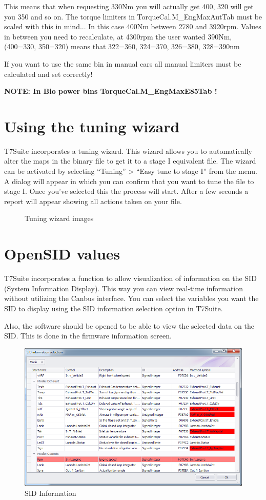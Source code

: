 \documentclass[11pt,a4paper]{book}
\newcommand{\Mfig}[1]{%
\begin{figure}[<+htpb+>]
    \centering
    \missingfigure{#1}
    \caption{#1}
\end{figure}}
\begin{document}
This means that when requesting 330Nm you will actually get 400, 320 will get you 350 and so on.
The torque limiters in TorqueCal.M\_EngMaxAutTab must be scaled with this in mind...
In this case 400Nm between 2780 and 3920rpm. Values in between you need to recalculate, at
4300rpm the user wanted 390Nm, (400=330, 350=320) means that 322=360, 324=370, 326=380,
328=390nm

\Mfig{}

If you want to use the same bin in manual cars all manual limiters must be calculated and set
correctly!

\textbf{NOTE: In Bio power bins TorqueCal.M\_EngMaxE85Tab !}

\chapter{Using the tuning wizard}
T7Suite incorporates a tuning wizard. This wizard allows you to automatically alter the maps in the
binary file to get it to a stage I equivalent file. The wizard can be activated by selecting “Tuning” >
“Easy tune to stage I” from the menu. A dialog will appear in which you can confirm that you want to
tune the file to stage I. Once you’ve selected this the process will start. After a few seconds a report
will appear showing all actions taken on your file.

\Mfig{Tuning wizard images}

\chapter{OpenSID values}
T7Suite incorporates a function to allow visualization of information on the SID (System Information
Display). This way you can view real-time information without utilizing the Canbus interface. You can
select the variables you want the SID to display using the SID information selection option in T7Suite.

Also, the software should be opened to be able to view the selected data on the SID. This is done in
the firmware information screen.
\begin{figure}[<+htpb+>]
    \centering
    \includegraphics[width=.9\linewidth]{sid.png}
    \caption{SID Information}
    \label{fig:}
\end{figure}
\end{document}
